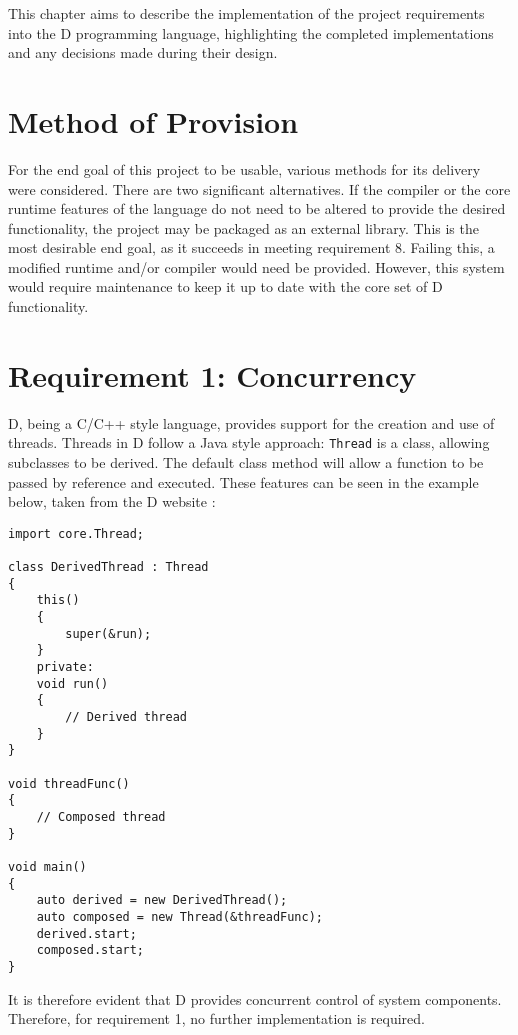 %
%
%
This chapter aims to describe the implementation of the project requirements into the D
programming language, highlighting the completed implementations and any  
decisions made during their design.

\section{Method of Provision}
For the end goal of this project to be usable, various methods for its delivery 
were considered. There are two significant alternatives. 
If the compiler or the 
core runtime features of the language do not need to be altered to provide the 
desired functionality, the project may be packaged as an external library. 
This is the most desirable end goal, as it succeeds in meeting requirement 8. 
Failing this, a modified runtime and/or compiler would need be provided.
However, this system would require maintenance to keep it up to date with the
core set of D functionality. 

\section{Requirement 1: Concurrency}
D, being a C/C++ style language, provides support for the creation and use of 
threads. Threads in D follow a Java style approach: \texttt{Thread} is a class, 
allowing subclasses to be derived. The default 
class method will allow a function to be passed by reference and executed. 
These features can be seen in the example below, taken from the D website
\cite{core-thread}: 
\begin{lstlisting}[basicstyle=\small]
import core.Thread; 

class DerivedThread : Thread
{
    this()
    {
        super(&run);
    }
    private:
    void run()
    {
        // Derived thread 
    }
}

void threadFunc()
{
    // Composed thread
}

void main()
{
    auto derived = new DerivedThread();
    auto composed = new Thread(&threadFunc);
    derived.start; 
    composed.start;
}
\end{lstlisting}
It is therefore evident that D provides 
concurrent control of system components. Therefore, for requirement 1, no
further implementation is required. 

